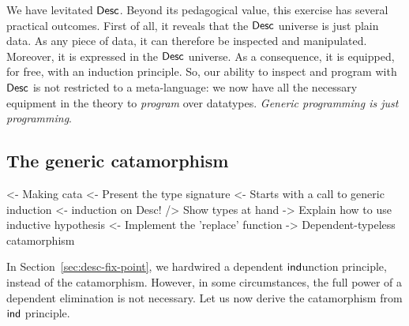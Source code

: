 We have levitated \(\Desc\). Beyond its pedagogical value, this
exercise has several practical outcomes. First of all, it reveals that
the $\Desc$ universe is just plain data. As any piece of data, it can
therefore be inspected and manipulated. Moreover, it is expressed in
the $\Desc$ universe. As a consequence, it is equipped, for free, with
an induction principle. So, our ability to inspect and program with
$\Desc$ is not restricted to a meta-language: we now have all the
necessary equipment in the theory to \emph{program} over
datatypes. \emph{Generic programming is just
  programming}.


\subsection{The generic catamorphism}

\begin{wstructure}
<- Making cata
    <- Present the type signature
    <- Starts with a call to generic induction
        <- induction on Desc!
        /> Show types at hand
        -> Explain how to use inductive hypothesis
    <- Implement the 'replace' function
    -> Dependent-typeless catamorphism 
\end{wstructure}

In Section~\ref{sec:desc-fix-point}, we hardwired a dependent
$\F{ind}$unction principle, instead of the catamorphism. However, in
some circumstances, the full power of a dependent elimination is not
necessary. Let us now derive the catamorphism
from $\F{ind}$ principle.

\newcommand{\cata}{\F{cata}}

